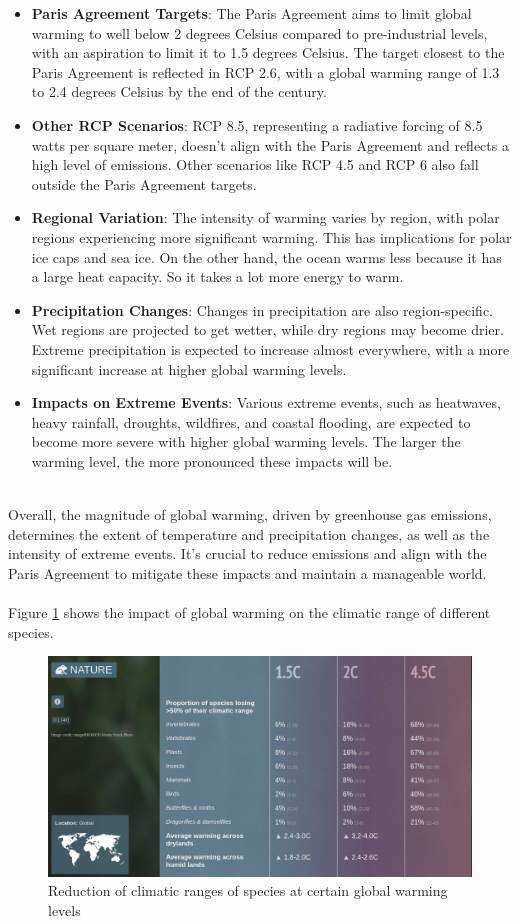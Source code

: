 \documentclass[../summary.tex]{subfiles}
\begin{document}
\begin{itemize}
	\item \textbf{Paris Agreement Targets}: The Paris Agreement aims to limit global warming to well below 2 degrees Celsius compared to pre-industrial levels, with an aspiration to limit it to 1.5 degrees Celsius. The target closest to the Paris Agreement is reflected in RCP 2.6, with a global warming range of 1.3 to 2.4 degrees Celsius by the end of the century.
	\item \textbf{Other RCP Scenarios}: RCP 8.5, representing a radiative forcing of 8.5 watts per square meter, doesn't align with the Paris Agreement and reflects a high level of emissions. Other scenarios like RCP 4.5 and RCP 6 also fall outside the Paris Agreement targets.
	\item \textbf{Regional Variation}: The intensity of warming varies by region, with polar regions experiencing more significant warming. This has implications for polar ice caps and sea ice. On the other hand, the ocean warms less because it has a large heat capacity. So it takes a lot more energy to warm.
	\item \textbf{Precipitation Changes}: Changes in precipitation are also region-specific. Wet regions are projected to get wetter, while dry regions may become drier. Extreme precipitation is expected to increase almost everywhere, with a more significant increase at higher global warming levels.
	\item \textbf{Impacts on Extreme Events}: Various extreme events, such as heatwaves, heavy rainfall, droughts, wildfires, and coastal flooding, are expected to become more severe with higher global warming levels. The larger the warming level, the more pronounced these impacts will be.
\end{itemize}
\ \\
Overall, the magnitude of global warming, driven by greenhouse gas emissions, determines the extent of temperature and precipitation changes, as well as the intensity of extreme events. It's crucial to reduce emissions and align with the Paris Agreement to mitigate these impacts and maintain a manageable world.\\
\\
Figure \ref{fig:climaticrange} shows the impact of global warming on the climatic range of  different species.

\begin{figure}[H]
	\centering
	\includegraphics[width=0.8\linewidth]{../images/climatic_range}
	\caption{Reduction of climatic ranges of species at certain global warming levels}
	\label{fig:climaticrange}
\end{figure}
\end{document}
